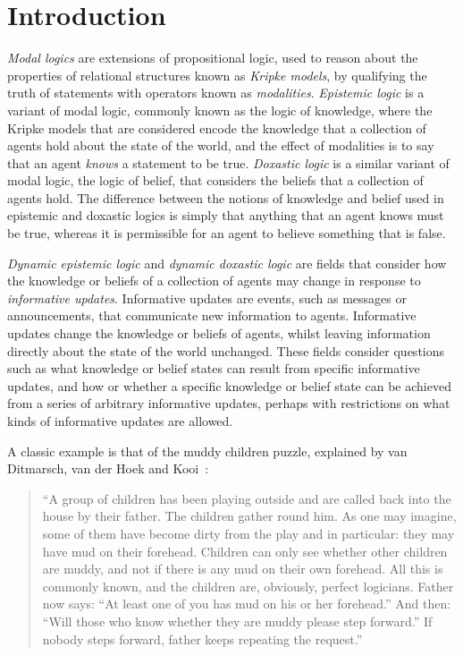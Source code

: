 \chapter{Introduction}


{\em Modal logics} are extensions of propositional logic, used to reason about
the properties of relational structures known as {\em Kripke models}, by
qualifying the truth of statements with operators known as {\em modalities}.
{\em Epistemic logic} is a variant of modal logic, commonly known as the logic
of knowledge, where the Kripke models that are considered encode the knowledge
that a collection of agents hold about the state of the world, and the effect of
modalities is to say that an agent {\em knows} a statement to be true. {\em
Doxastic logic} is a similar variant of modal logic, the logic of belief, that
considers the beliefs that a collection of agents hold. The difference between
the notions of knowledge and belief used in epistemic and doxastic logics is
simply that anything that an agent knows must be true, whereas it is permissible
for an agent to believe something that is false.

{\em Dynamic epistemic logic} and {\em dynamic doxastic logic} are fields that
consider how the knowledge or beliefs of a collection of agents may change in
response to {\em informative updates}. Informative updates are events, such as
messages or announcements, that communicate new information to agents. 
Informative updates change the knowledge or beliefs of agents, whilst leaving
information directly about the state of the world unchanged.  These fields
consider questions such as what knowledge or belief states can result from
specific informative updates, and how or whether a specific knowledge or belief
state can be achieved from a series of arbitrary informative updates, perhaps
with restrictions on what kinds of informative updates are allowed.

A classic example is that of the muddy children puzzle, explained by van
Ditmarsch, van der Hoek and Kooi~\cite{vanditmarsch2007dynamic}:

\begin{quote}
``A group of children has been playing outside and are called back into the house
by their father. The children gather round him. As one may imagine, some of them
have become dirty from the play and in particular: they may have mud on their
forehead. Children can only see whether other children are muddy, and not if
there is any mud on their own forehead. All this is commonly known, and the
children are, obviously, perfect logicians. Father now says: “At least one of
you has mud on his or her forehead.” And then: “Will those who know whether they
are muddy please step forward.” If nobody steps forward, father keeps repeating
the request.''
\end{quote}

